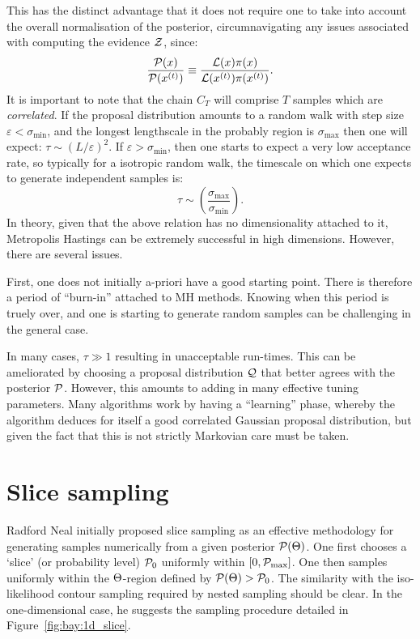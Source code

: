 This has the distinct advantage that it does not require one to take into account the overall normalisation of the posterior, circumnavigating any issues associated with computing the evidence $\mathcal{Z}$, since:
\begin{equation}
  \frac{\mathcal{P}(x)}{\mathcal{P}(x^{(t)})} \equiv
  \frac{\mathcal{L}(x)\pi(x)}{\mathcal{L}(x^{(t)})\pi(x^{(t)})}.
\end{equation}
It is important to note that the chain $C_T$ will comprise $T$ samples which are {\em correlated}. If the proposal distribution amounts to a random walk with step size $\varepsilon<\sigma_{\min{}}$, and the longest lengthscale in the probably region is $\sigma_{\max{}}$  then one will expect: $\tau \sim {(L/\varepsilon)}^2$. If $\varepsilon>\sigma_{\min{}}$, then one starts to expect a very low acceptance rate, so typically for a isotropic random walk, the timescale on which one expects to generate independent samples is:
\begin{equation}
  \tau \sim \left( \frac{\sigma_{\max{}}}{\sigma_{\min{}}} \right).
\end{equation}
In theory, given that the above relation has no dimensionality attached to it, Metropolis Hastings can be extremely successful in high dimensions. However, there are several issues.

First, one does not initially a-priori have a good starting point. There is therefore a period of ``burn-in'' attached to MH methods. Knowing when this period is truely over, and one is starting to generate random samples can be challenging in the general case.

In many cases, $\tau\gg1$ resulting in unacceptable run-times. This can be ameliorated by choosing a proposal distribution $\mathcal{Q}$ that better agrees with the posterior $\mathcal{P}$. However, this amounts to adding in many effective tuning parameters. Many algorithms work by having a ``learning'' phase, whereby the algorithm deduces for itself a good correlated Gaussian proposal distribution, but given the fact that this is not strictly Markovian care must be taken.



\section{Slice sampling}
\label{sec:sm:slice}
Radford Neal initially proposed slice sampling as an effective methodology for generating samples numerically from a given posterior $\mathcal{P}(\Theta)$. One first chooses a `slice' (or probability level) $\mathcal{P}_0$ uniformly within $[0,\mathcal{P}_{\mathrm{max}}]$. One then samples uniformly within the $\Theta$-region defined by $\mathcal{P}(\Theta)>\mathcal{P}_0$. The similarity with the iso-likelihood contour sampling required by nested sampling should be clear. In the one-dimensional case, he suggests the sampling procedure detailed in Figure~\ref{fig:bay:1d_slice}.

